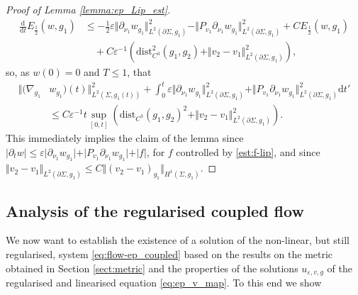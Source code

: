 \documentclass[10pt,reqno]{amsart}
\theoremstyle{plain}
\theoremstyle{definition}
\numberwithin{equation}{section}
\newcommand{\Si}{\Sigma}
\newcommand{\ep}{\varepsilon}
\newcommand{\norm}[1]{\Vert#1\Vert}
\newcommand{\dd}{\mathrm{d}} %
\newcommand{\abs}[1]{\vert#1\vert}
\newcommand{\eps}{\varepsilon}
\newcommand{\dist}{\text{dist}}
\newcommand{\hf}{\frac{1}{2}} %
\newcommand{\p}{\partial} %
\begin{document}
\begin{proof}[Proof of Lemma \ref{lemma:ep_Lip_est}]
    \begin{align*}
        \frac{\dd}{\dd t}E_{\hf}(w,g_1) &\leq -\hf \ep\norm{\p_{\nu_1}w_{g_1}}_{L^2(\p\Si,g_1)}^2 -\norm{P_{v_1}\p_{\nu_1}w_{g_1}}_{L^2(\p\Si,g_1)}^2+ CE_{\hf}(w,g_1)\\
        &\quad+ C\ep^{-1} \left(\dist^2_{C^{3}}(g_1,g_2)+\norm{v_2-v_1}^2_{L^2(\p\Si,g_1)}\right),
    \end{align*}
    so, as $w(0)=0$ and $T\leq 1$, that
    \begin{align*}
        \norm{(\nabla_{g_1}&w_{g_1})(t)}_{L^2(\Si,g_1(t))}^2 + \int_0^t \ep\norm{\p_{\nu_1}w_{g_1}}_{L^2(\p\Si,g_1)}^2 + \norm{P_{v_1}\p_{\nu_1}w_{g_1}}_{L^2(\p\Si,g_1)}^2\dd t'\\
        &\le C\ep^{-1}t\sup\limits_{[0,t]}\left(\dist_{C^{3}}(g_1,g_2)^2 + \norm{v_2-v_1}_{L^2(\p\Si,g_1)}^2\right).
    \end{align*}
    This immediately implies the claim of the lemma since $\abs{\p_t w} \leq \eps\abs{\p_{\nu_1}w_{g_1}}+ \abs{P_{v_1}\p_{\nu_1}w_{g_1}}+ \abs{f}$, for $f$ controlled by \eqref{est:f-lip}, and since $\norm{v_2-v_1}_{L^2(\p\Si,g_1)}\leq C \norm{(v_2-v_1)_{g_1}}_{H^1(\Si,g_1)}$.
\end{proof}

\subsection{Analysis of the regularised coupled flow}\label{subsec:reg-coupled}
We now want to establish the existence of a solution of the non-linear, but still regularised, system \eqref{eq:flow-ep_coupled} based on the results on the metric obtained in Section \ref{sect:metric} and the properties of the solutions $u_{\ep,v,g}$ of the regularised and linearised equation \eqref{eq:ep_v_map}. To this end we show
\end{document}
